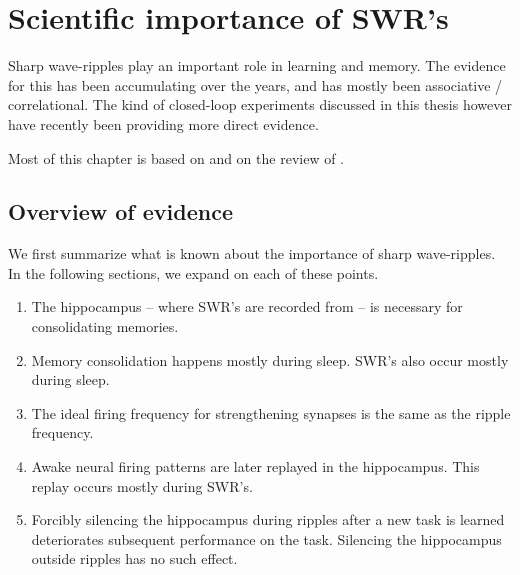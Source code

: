 \chapter{Scientific importance of SWR's}
\label{ch:science}

Sharp wave-ripples play an important role in learning and memory.\footnotemark{} The evidence for this has been accumulating over the years, and has mostly been associative / correlational. The kind of closed-loop experiments discussed in this thesis however have recently been providing more direct evidence.


Most of this chapter is based on \cite{Buzsaki2015} and on the review of \citeauthor{Girardeau2011} \cite{Girardeau2011}.




\section{Overview of evidence}

We first summarize what is known about the importance of sharp wave-ripples.
In the following sections, we expand on each of these points.

\begin{enumerate}
\item The hippocampus -- where SWR's are recorded from -- is necessary for consolidating memories.
\item Memory consolidation happens mostly during sleep. SWR's also occur mostly during sleep.
\item The ideal firing frequency for strengthening synapses is the same as the ripple frequency.
\item Awake neural firing patterns are later replayed in the hippocampus. This replay occurs mostly during SWR's.
\item Forcibly silencing the hippocampus during ripples after a new task is learned deteriorates subsequent performance on the task. Silencing the hippocampus outside ripples has no such effect.
\end{enumerate}

